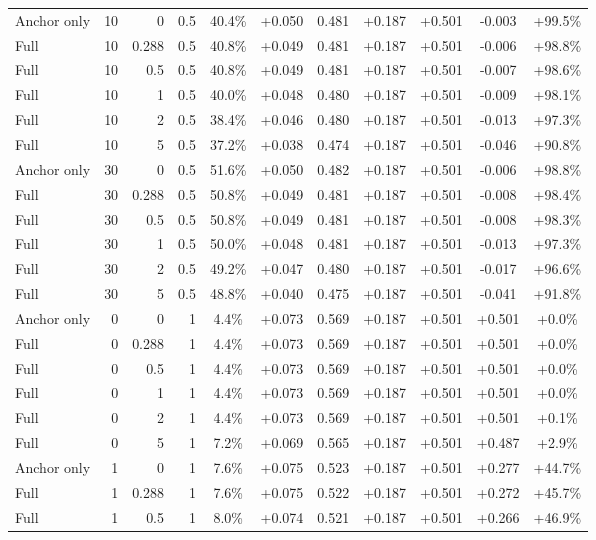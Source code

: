 \begin{table}[htbp]
\begin{tabular}{lrrrccccccc}
Anchor only & 10 & 0 & 0.5 & 40.4\% & +0.050 & 0.481 & +0.187 & +0.501 & -0.003 & +99.5\% \\
Full & 10 & 0.288 & 0.5 & 40.8\% & +0.049 & 0.481 & +0.187 & +0.501 & -0.006 & +98.8\% \\
Full & 10 & 0.5 & 0.5 & 40.8\% & +0.049 & 0.481 & +0.187 & +0.501 & -0.007 & +98.6\% \\
Full & 10 & 1 & 0.5 & 40.0\% & +0.048 & 0.480 & +0.187 & +0.501 & -0.009 & +98.1\% \\
Full & 10 & 2 & 0.5 & 38.4\% & +0.046 & 0.480 & +0.187 & +0.501 & -0.013 & +97.3\% \\
Full & 10 & 5 & 0.5 & 37.2\% & +0.038 & 0.474 & +0.187 & +0.501 & -0.046 & +90.8\% \\
Anchor only & 30 & 0 & 0.5 & 51.6\% & +0.050 & 0.482 & +0.187 & +0.501 & -0.006 & +98.8\% \\
Full & 30 & 0.288 & 0.5 & 50.8\% & +0.049 & 0.481 & +0.187 & +0.501 & -0.008 & +98.4\% \\
Full & 30 & 0.5 & 0.5 & 50.8\% & +0.049 & 0.481 & +0.187 & +0.501 & -0.008 & +98.3\% \\
Full & 30 & 1 & 0.5 & 50.0\% & +0.048 & 0.481 & +0.187 & +0.501 & -0.013 & +97.3\% \\
Full & 30 & 2 & 0.5 & 49.2\% & +0.047 & 0.480 & +0.187 & +0.501 & -0.017 & +96.6\% \\
Full & 30 & 5 & 0.5 & 48.8\% & +0.040 & 0.475 & +0.187 & +0.501 & -0.041 & +91.8\% \\
Anchor only & 0 & 0 & 1 & 4.4\% & +0.073 & 0.569 & +0.187 & +0.501 & +0.501 & +0.0\% \\
Full & 0 & 0.288 & 1 & 4.4\% & +0.073 & 0.569 & +0.187 & +0.501 & +0.501 & +0.0\% \\
Full & 0 & 0.5 & 1 & 4.4\% & +0.073 & 0.569 & +0.187 & +0.501 & +0.501 & +0.0\% \\
Full & 0 & 1 & 1 & 4.4\% & +0.073 & 0.569 & +0.187 & +0.501 & +0.501 & +0.0\% \\
Full & 0 & 2 & 1 & 4.4\% & +0.073 & 0.569 & +0.187 & +0.501 & +0.501 & +0.1\% \\
Full & 0 & 5 & 1 & 7.2\% & +0.069 & 0.565 & +0.187 & +0.501 & +0.487 & +2.9\% \\
Anchor only & 1 & 0 & 1 & 7.6\% & +0.075 & 0.523 & +0.187 & +0.501 & +0.277 & +44.7\% \\
Full & 1 & 0.288 & 1 & 7.6\% & +0.075 & 0.522 & +0.187 & +0.501 & +0.272 & +45.7\% \\
Full & 1 & 0.5 & 1 & 8.0\% & +0.074 & 0.521 & +0.187 & +0.501 & +0.266 & +46.9\% \\

\end{tabular}
\end{table}
